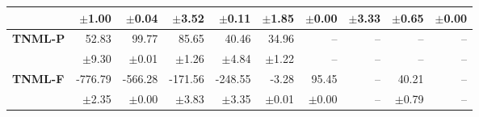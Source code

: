 \begin{table}[!htbp]
\begin{tabular}{lrrrrr||rrrr}
 & $\pm$1.00 & $\pm$0.04 & $\pm$3.52 & $\pm$0.11 & $\pm$1.85 & $\pm$0.00 & $\pm$3.33 & $\pm$0.65 & $\pm$0.00 \\
\midrule
\textbf{TNML-P} & 52.83 & 99.77 & 85.65 & 40.46 & 34.96 & -- & -- & -- & -- \\
 & $\pm$9.30 & $\pm$0.01 & $\pm$1.26 & $\pm$4.84 & $\pm$1.22 & -- & -- & -- & -- \\
\midrule
\textbf{TNML-F} & -776.79 & -566.28 & -171.56 & -248.55 & -3.28 & 95.45 & -- & 40.21 & -- \\
 & $\pm$2.35 & $\pm$0.00 & $\pm$3.83 & $\pm$3.35 & $\pm$0.01 & $\pm$0.00 & -- & $\pm$0.79 & -- \\
\midrule
\bottomrule
\end{tabular}
\end{table}